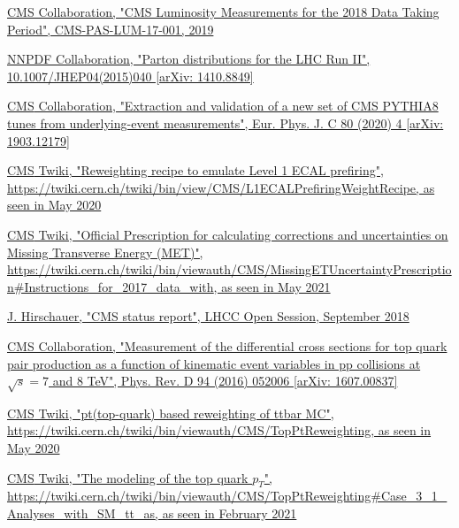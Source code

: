 \documentclass[a4paper, 10pt, openright]{report}
\begin{document}
\begin{thebibliography}{1}
\href{http://inspirehep.net/record/1736713/}{CMS Collaboration,
"CMS Luminosity Measurements for the 2018 Data Taking Period",
CMS-PAS-LUM-17-001, 2019}

\href{https://arxiv.org/abs/1410.8849}{NNPDF Collaboration,
"Parton distributions for the LHC Run II", 10.1007/JHEP04(2015)040 [arXiv: 1410.8849]}

\href{https://arxiv.org/abs/1903.12179}{\ac{CMS} Collaboration,
"Extraction and validation of a new set of CMS PYTHIA8 tunes from underlying-event measurements", Eur. Phys. J. C 80 (2020) 4 [arXiv: 1903.12179]}

\href{https://twiki.cern.ch/twiki/bin/view/CMS/L1ECALPrefiringWeightRecipe}{\ac{CMS} Twiki,
"Reweighting recipe to emulate Level 1 ECAL prefiring", \url{https://twiki.cern.ch/twiki/bin/view/CMS/L1ECALPrefiringWeightRecipe}, as seen in May 2020}

\href{https://twiki.cern.ch/twiki/bin/viewauth/CMS/MissingETUncertaintyPrescription\#Instructions_for_2017_data_with}{\ac{CMS} Twiki,
"Official Prescription for calculating corrections and uncertainties on Missing Transverse Energy (MET)", \url{https://twiki.cern.ch/twiki/bin/viewauth/CMS/MissingETUncertaintyPrescription\#Instructions_for_2017_data_with}, as seen in May 2021}

\href{https://indico.cern.ch/event/744723/contributions/3077439/attachments/1714201/2764846/hirschauer_cms_lhcc_12sep2018.pdf}{J. Hirschauer,
"CMS status report",
LHCC Open Session, September 2018}

\href{https://arxiv.org/abs/1607.00837}{CMS Collaboration,
"Measurement of the differential cross sections for top quark pair production as a function of kinematic event variables in pp collisions at $\sqrt{s} = 7$ and 8 TeV",
Phys. Rev. D 94 (2016) 052006 [arXiv: 1607.00837]}

\href{https://twiki.cern.ch/twiki/bin/viewauth/CMS/TopPtReweighting}{\ac{CMS} Twiki,
"pt(top-quark) based reweighting of ttbar MC", \url{https://twiki.cern.ch/twiki/bin/viewauth/CMS/TopPtReweighting}, as seen in May 2020}

\href{https://twiki.cern.ch/twiki/bin/viewauth/CMS/TopPtReweighting\#Case\_3\_1\_Analyses\_with\_SM\_tt\_as}{\ac{CMS} Twiki,
"The modeling of the top quark $p_T$", \url{https://twiki.cern.ch/twiki/bin/viewauth/CMS/TopPtReweighting\#Case\_3\_1\_Analyses\_with\_SM\_tt\_as}, as seen in February 2021}


\end{thebibliography}
\end{document}
